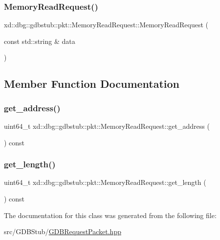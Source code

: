 \subsubsection{\texorpdfstring{Memory\+Read\+Request()}{MemoryReadRequest()}}
{\footnotesize\ttfamily xd\+::dbg\+::gdbstub\+::pkt\+::\+Memory\+Read\+Request\+::\+Memory\+Read\+Request (\begin{DoxyParamCaption}\item[{const std\+::string \&}]{data }\end{DoxyParamCaption})\hspace{0.3cm}{\ttfamily [inline]}}



\subsection{Member Function Documentation}
\mbox{\label{classxd_1_1dbg_1_1gdbstub_1_1pkt_1_1_memory_read_request_a87c67d1b89016cc02a8ea925ac191995}} 
\subsubsection{\texorpdfstring{get\+\_\+address()}{get\_address()}}
{\footnotesize\ttfamily uint64\+\_\+t xd\+::dbg\+::gdbstub\+::pkt\+::\+Memory\+Read\+Request\+::get\+\_\+address (\begin{DoxyParamCaption}{ }\end{DoxyParamCaption}) const\hspace{0.3cm}{\ttfamily [inline]}}

\mbox{\label{classxd_1_1dbg_1_1gdbstub_1_1pkt_1_1_memory_read_request_aaf1f2b7c78014f97ffe900415742aa4c}} 
\subsubsection{\texorpdfstring{get\+\_\+length()}{get\_length()}}
{\footnotesize\ttfamily uint64\+\_\+t xd\+::dbg\+::gdbstub\+::pkt\+::\+Memory\+Read\+Request\+::get\+\_\+length (\begin{DoxyParamCaption}{ }\end{DoxyParamCaption}) const\hspace{0.3cm}{\ttfamily [inline]}}



The documentation for this class was generated from the following file\+:\begin{DoxyCompactItemize}
\item 
src/\+G\+D\+B\+Stub/\mbox{\hyperlink{_g_d_b_request_packet_8hpp}{G\+D\+B\+Request\+Packet.\+hpp}}\end{DoxyCompactItemize}
